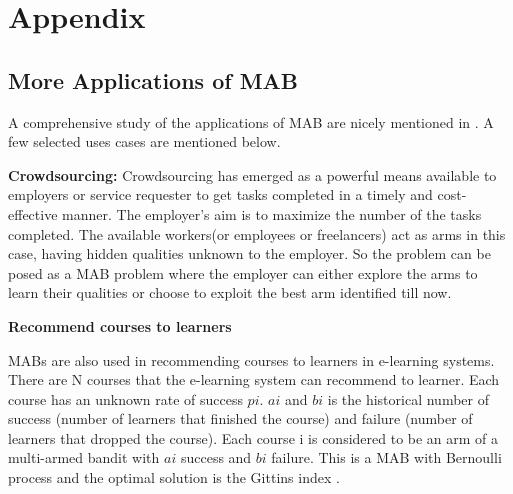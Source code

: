 \documentclass[11pt]{article}
\begin{document}
{


}

\section{Appendix}

\subsection{More Applications of MAB}
A comprehensive study of the applications of MAB are nicely mentioned in \cite{bouneffouf2019survey}. A few selected uses cases are mentioned below.

\textbf{Crowdsourcing:} Crowdsourcing has emerged as a powerful means available to employers or service requester to get tasks completed in a timely and cost-effective manner\cite{medium_abhishek}. The employer’s aim is to maximize the number of the tasks completed. The available workers(or employees or freelancers) act as arms in this case, having hidden qualities unknown to the employer. So the problem can be posed as a MAB problem where the employer can either explore the arms to learn their qualities or choose to exploit the best arm identified till now.

\textbf{Recommend courses to learners}

MABs are also used in recommending courses to learners in e-learning systems. There are N courses that the e-learning system can recommend to learner. Each course has an unknown rate of success $pi$. $ai$ and $bi$ is the historical number of success (number of learners that finished the course) and failure (number of learners that dropped the course). Each course i is considered to be an arm of a multi-armed bandit with $ai$ success and $bi$ failure. This is a MAB with Bernoulli process and the optimal solution is the Gittins index \cite{whittle1980multi}.
\end{document}
